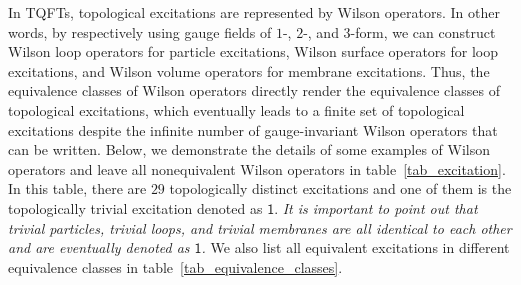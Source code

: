 \documentclass[11pt,nofootinbib,preprint]{revtex4-1}
\begin{document}
In TQFTs, topological excitations  are represented by Wilson operators. In other words, by respectively using gauge fields of $1$-, $2$-, and $3$-form, we can construct Wilson loop operators for particle excitations, Wilson surface operators for loop excitations, and  Wilson volume operators for membrane excitations. Thus,   the equivalence classes of Wilson operators directly render the equivalence classes of topological excitations, which eventually leads to a finite set of topological excitations despite the infinite number of gauge-invariant Wilson operators that can be written.  Below, we demonstrate the details of some examples of  Wilson operators and leave all nonequivalent Wilson operators in table~\ref{tab_excitation}. In this table, there are $29$ topologically distinct excitations and one of them is the topologically trivial excitation denoted as $\mathsf{1}$.  \textit{It is important to point out that trivial particles, trivial loops, and trivial membranes are all identical to each other and are eventually denoted as $\mathsf{1}$.} We also list all equivalent excitations in different equivalence classes in table~\ref{tab_equivalence_classes}.
\end{document}
